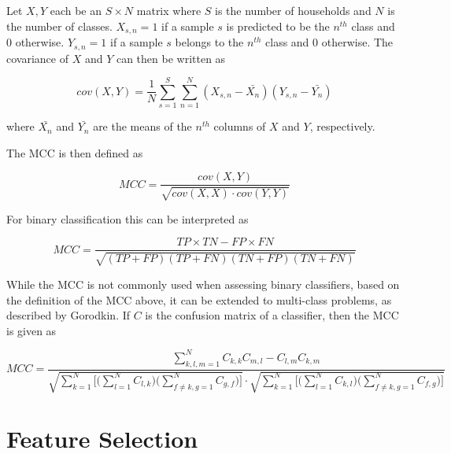 Let $X,Y$ each be an $S\times N$ matrix where $S$ is the number of households and $N$ is the number of classes. $X_{s,n}=1$ if a sample $s$ is predicted to be the $n^{th}$ class and 0 otherwise. $Y_{s,n}=1$ if a sample $s$ belongs to the $n^{th}$ class and 0 otherwise. The covariance of $X$ and $Y$ can then be written as

\[cov(X,Y)=\frac{1}{N}\sum^S_{s=1}\sum^N_{n=1}(X_{s,n}-\bar{X_n})(Y_{s,n}-\bar{Y_n})\]

where $\bar{X_n}$ and $\bar{Y_n}$ are the means of the $n^{th}$ columns of $X$ and $Y$, respectively.

The MCC is then defined as

\[MCC=\frac{cov(X,Y)}{\sqrt{cov(X,X)\cdot cov(Y,Y)}}\]


For binary classification this can be interpreted as

\[MCC=\frac{TP\times TN-FP\times FN}{\sqrt{(TP+FP)(TP+FN)(TN+FP)(TN+FN)}}\]

While the MCC is not commonly used when assessing binary classifiers, based on the definition of the MCC above, it can be extended to multi-class problems, as described by Gorodkin\cite{Gorodkin}. If $C$ is the confusion matrix of a classifier, then the MCC is given as

\[MCC=\frac{\sum\limits^N_{k,l,m=1}C_{k,k}C_{m,l}-C_{l,m}C_{k,m}}{\sqrt{\sum\limits^N_{k=1}\bigg[\bigg(\sum\limits^N_{l=1}C_{l,k}\bigg)\bigg(\sum\limits^N_{f\ne k,g=1}C_{g,f}\bigg)\bigg]}\cdot \sqrt{\sum\limits^N_{k=1}\bigg[\bigg(\sum\limits^N_{l=1}C_{k,l}\bigg)\bigg(\sum\limits^N_{f\ne k,g=1}C_{f,g}\bigg)\bigg]}}\] 


\section{Feature Selection}


